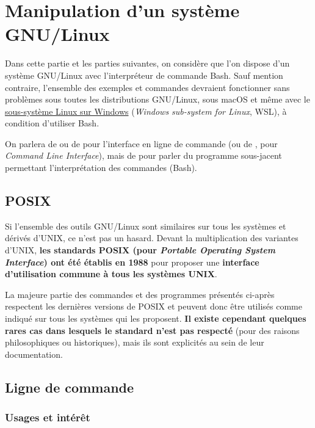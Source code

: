 \section{Manipulation d'un système GNU/Linux}
Dans cette partie et les parties suivantes, on considère que l'on dispose d'un système GNU/Linux avec l'interpréteur de commande Bash. Sauf mention contraire, l'ensemble des exemples et commandes devraient fonctionner sans problèmes sous toutes les distributions GNU/Linux, sous macOS et même avec le \href{https://docs.microsoft.com/fr-fr/windows/wsl/install-win10}{sous-système Linux sur Windows} (\textit{Windows sub-system for Linux}, WSL), à condition d'utiliser Bash.

 On parlera de  ou de  pour l'interface en ligne de commande (ou de , pour \textit{Command Line Interface}), mais de  pour parler du programme sous-jacent permettant l'interprétation des commandes (Bash).

\vspace{-3mm}
\subsection{POSIX} \label{sec:POSIX}
\vspace{-3mm}
Si l'ensemble des outils GNU/Linux sont similaires sur tous les systèmes et dérivés d'UNIX, ce n'est pas un hasard. Devant la multiplication des variantes d'UNIX, \textbf{les standards POSIX (pour \textit{Portable Operating System Interface}) ont été établis en 1988} pour proposer une \textbf{interface d'utilisation commune à tous les systèmes UNIX}.

La majeure partie des commandes et des programmes présentés ci-après respectent les dernières versions de  POSIX et peuvent donc être utilisés comme indiqué sur tous les systèmes qui les proposent. \textbf{Il existe cependant quelques rares cas dans lesquels le standard n'est pas respecté} (pour des raisons philosophiques ou historiques), mais ils sont explicités au sein de leur documentation.

\subsection{Ligne de commande}

\subsubsection{Usages et intérêt}


